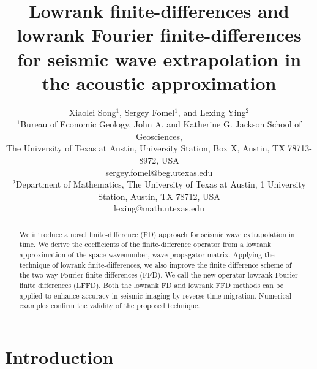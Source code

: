 

\title[LFD and LFFD]{Lowrank finite-differences and lowrank Fourier finite-differences for seismic wave extrapolation 
in the acoustic approximation}

\author[X. Song, S. Fome,l and L. Ying]{Xiaolei Song$^1$, Sergey Fomel$^1$, and Lexing Ying$^2$\\
$^1$Bureau of Economic Geology, 
John A. and Katherine G. Jackson School of Geosciences, \\
The University of Texas at Austin,
University Station, Box X,
Austin, TX 78713-8972,
USA \\
sergey.fomel@beg.utexas.edu \\ 
$^2$Department of Mathematics,
The University of Texas at Austin,
1 University Station,
Austin, TX 78712,
USA \\
lexing@math.utexas.edu
}



\label{firstpage}


\maketitle

\begin{abstract}
  We introduce a novel finite-difference (FD) approach for seismic wave extrapolation in time.  
  We derive the coefficients of the finite-difference operator from 
  a lowrank approximation of the space-wavenumber, wave-propagator matrix. 
  Applying the technique of lowrank finite-differences, 
  we also improve the finite difference scheme of the two-way Fourier finite differences (FFD).
  We call the new operator lowrank Fourier finite differences (LFFD). 
   Both the lowrank FD and lowrank FFD methods can be applied to enhance accuracy in seismic imaging by reverse-time migration.
  Numerical examples confirm the validity of the proposed technique.
\end{abstract}


\section{Introduction}

